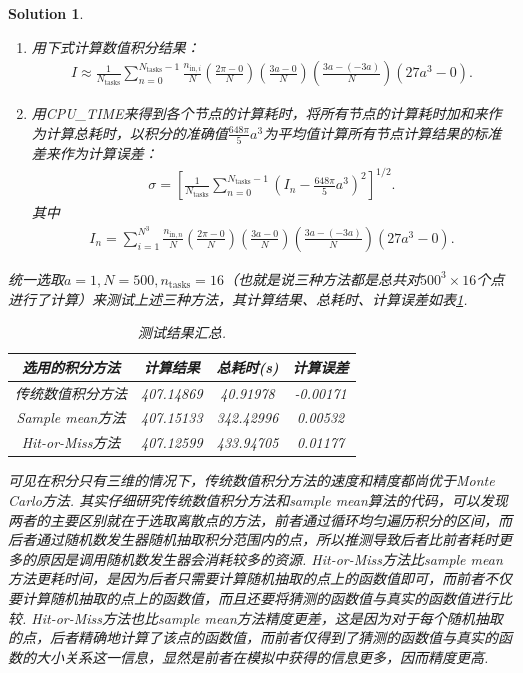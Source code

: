 \documentclass[UTF8,10pt,a4paper]{article}
\theoremstyle{Problem}
\theoremstyle{Solution}
\newtheorem*{sol}{Solution}
\begin{document}
\begin{sol}
\begin{itemize}
\begin{itemize}
\begin{enumerate}
                \item 用下式计算数值积分结果：
                \begin{align}
                    I\approx\frac{1}{N_{\text{tasks}}}\sum_{n=0}^{N_{\text{tasks}}-1}\frac{n_{\text{in},i}}{N}\left(\frac{2\pi-0}{N}\right)\left(\frac{3a-0}{N}\right)\left(\frac{3a-(-3a)}{N}\right)(27a^3-0).
                \end{align}
                \item 用CPU\_TIME来得到各个节点的计算耗时，将所有节点的计算耗时加和来作为计算总耗时，以积分的准确值$\frac{648\pi}{5}a^3$为平均值计算所有节点计算结果的标准差来作为计算误差：
                \begin{align}
                    \sigma=\left[\frac{1}{N_{\text{tasks}}}\sum_{n=0}^{N_{\text{tasks}}-1}\left(I_n-\frac{648\pi}{5}a^3\right)^2\right]^{1/2}.
                \end{align}
                其中
                \begin{align}
                    I_n=\sum_{i=1}^{N^3}\frac{n_{\text{in},n}}{N}\left(\frac{2\pi-0}{N}\right)\left(\frac{3a-0}{N}\right)\left(\frac{3a-(-3a)}{N}\right)(27a^3-0).
                \end{align}
            \end{enumerate}
        \end{itemize}
    \end{itemize}
    统一选取$a=1,N=500,n_{\text{tasks}}=16$（也就是说三种方法都是总共对$500^3\times 16$个点进行了计算）来测试上述三种方法，其计算结果、总耗时、计算误差如表\ref{2-T}.

    \begin{table}[h]
        \centering
        \caption{测试结果汇总.}
        \label{2-T}
        \begin{tabular}{c|ccc}
        选用的积分方法 & 计算结果 & 总耗时(s) & 计算误差 \\ \hline
        传统数值积分方法 & 407.14869 & 40.91978 & -0.00171 \\
        Sample mean方法 & 407.15133 & 342.42996 & 0.00532 \\
        Hit-or-Miss方法 & 407.12599 & 433.94705 & 0.01177
        \end{tabular}
    \end{table}

    可见在积分只有三维的情况下，传统数值积分方法的速度和精度都尚优于Monte Carlo方法. 其实仔细研究传统数值积分方法和sample mean算法的代码，可以发现两者的主要区别就在于选取离散点的方法，前者通过循环均匀遍历积分的区间，而后者通过随机数发生器随机抽取积分范围内的点，所以推测导致后者比前者耗时更多的原因是调用随机数发生器会消耗较多的资源. Hit-or-Miss方法比sample mean方法更耗时间，是因为后者只需要计算随机抽取的点上的函数值即可，而前者不仅要计算随机抽取的点上的函数值，而且还要将猜测的函数值与真实的函数值进行比较. Hit-or-Miss方法也比sample mean方法精度更差，这是因为对于每个随机抽取的点，后者精确地计算了该点的函数值，而前者仅得到了猜测的函数值与真实的函数的大小关系这一信息，显然是前者在模拟中获得的信息更多，因而精度更高.


\end{sol}
\end{document}
